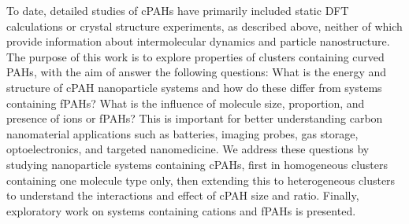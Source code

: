 %

To date, detailed studies of cPAHs have primarily included static DFT calculations or crystal structure experiments, as described above, neither of which provide information about intermolecular dynamics and particle nanostructure.
%
%
The purpose of this work is to explore properties of clusters containing curved PAHs, with the aim of answer the following questions: What is the energy and structure of cPAH nanoparticle systems and how do these differ from systems containing fPAHs? What is the influence of molecule size, proportion, and presence of ions or fPAHs?
This is important for better understanding carbon nanomaterial applications such as batteries, imaging probes, gas storage, optoelectronics, and targeted nanomedicine.
We address these questions by studying nanoparticle systems containing cPAHs, first in homogeneous clusters containing one molecule type only, then extending this to heterogeneous clusters to understand the interactions and effect of cPAH size and ratio. Finally, exploratory work on systems containing cations and fPAHs is presented.

